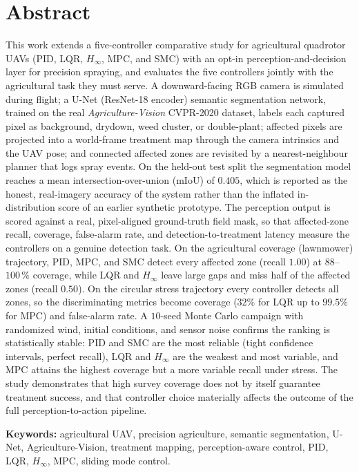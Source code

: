 \documentclass[12pt,a4paper]{article}
\begin{document}
\section*{Abstract}
This work extends a five-controller comparative study for agricultural quadrotor
UAVs (PID, LQR, $H_\infty$, MPC, and SMC) with an opt-in perception-and-decision
layer for precision spraying, and evaluates the five controllers jointly with the
agricultural task they must serve. A downward-facing RGB camera is simulated
during flight; a U-Net (ResNet-18 encoder) semantic segmentation network, trained
on the real \emph{Agriculture-Vision} CVPR-2020 dataset, labels each captured pixel
as background, drydown, weed cluster, or double-plant; affected pixels are
projected into a world-frame treatment map through the camera intrinsics and the
UAV pose; and connected affected zones are revisited by a nearest-neighbour
planner that logs spray events. On the held-out test split the segmentation model
reaches a mean intersection-over-union (mIoU) of $0.405$, which is reported as the
honest, real-imagery accuracy of the system rather than the inflated in-distribution
score of an earlier synthetic prototype. The perception output is scored against a
real, pixel-aligned ground-truth field mask, so that affected-zone recall, coverage,
false-alarm rate, and detection-to-treatment latency measure the controllers on a
genuine detection task. On the agricultural coverage (lawnmower) trajectory, PID,
MPC, and SMC detect every affected zone (recall $1.00$) at $88$--$100\,\%$ coverage,
while LQR and $H_\infty$ leave large gaps and miss half of the affected zones
(recall $0.50$). On the circular stress trajectory every controller detects all
zones, so the discriminating metrics become coverage ($32\%$ for LQR up to $99.5\%$
for MPC) and false-alarm rate. A $10$-seed Monte Carlo campaign with randomized
wind, initial conditions, and sensor noise confirms the ranking is statistically
stable: PID and SMC are the most reliable (tight confidence intervals, perfect
recall), LQR and $H_\infty$ are the weakest and most variable, and MPC attains the
highest coverage but a more variable recall under stress. The study demonstrates
that high survey coverage does not by itself guarantee treatment success, and that
controller choice materially affects the outcome of the full perception-to-action
pipeline.

\noindent\textbf{Keywords:} agricultural UAV, precision agriculture, semantic
segmentation, U-Net, Agriculture-Vision, treatment mapping, perception-aware
control, PID, LQR, $H_\infty$, MPC, sliding mode control.
\end{document}

